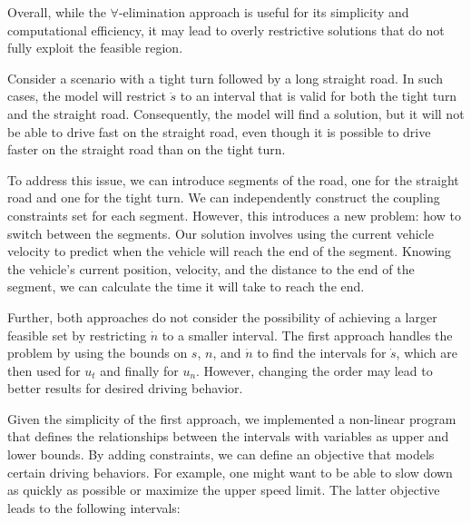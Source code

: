 Overall, while the $\forall$-elimination approach is useful for its simplicity and computational efficiency, it may lead to overly restrictive
solutions that do not fully exploit the feasible region.

Consider a scenario with a tight turn followed by a long straight road.
In such cases, the model will restrict $\dot{s}$ to an interval that is valid for both the tight turn and the straight road.
Consequently, the model will find a solution, but it will not be able to drive fast on the straight road, even though it is possible to drive faster
on the straight road than on the tight turn.

To address this issue, we can introduce segments of the road, one for the straight road and one for the tight turn.
We can independently construct the coupling constraints set for each segment.
However, this introduces a new problem: how to switch between the segments.
Our solution involves using the current vehicle velocity to predict when the vehicle will reach the end of the segment.
Knowing the vehicle's current position, velocity, and the distance to the end of the segment, we can calculate the time it will take to reach the
end.

Further, both approaches do not consider the possibility of achieving a larger feasible set by restricting $\dot{n}$ to a smaller interval.
The first approach handles the problem by using the bounds on $s$, $n$, and $\dot{n}$ to find the intervals for $\dot{s}$, which are then used for
$u_t$ and finally for $u_n$.
However, changing the order may lead to better results for desired driving behavior.

Given the simplicity of the first approach, we implemented a non-linear program that defines the relationships between the intervals with variables
as upper and lower bounds.
By adding constraints, we can define an objective that models certain driving behaviors.
For example, one might want to be able to slow down as quickly as possible or maximize the upper speed limit.
The latter objective leads to the following intervals:

